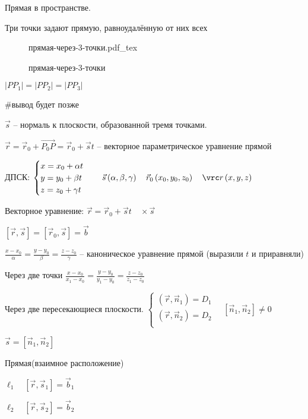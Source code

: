 \documentclass{book}
\theoremstyle{definition}
\newcommand\vect[1]{\overset{\longrightarrow}{#1}}
\newcommand{\incfig}[1]{%
    \def\svgwidth{\columnwidth}
    {#1.pdf_tex}
}
\begin{document}
Прямая в пространстве.

Три точки задают прямую, равноудалённую от них всех

\begin{figure}[ht]
    \centering
    \incfig{прямая-через-3-точки}
    \caption{прямая-через-3-точки}
    \label{fig:прямая через 3 точки}
\end{figure}

$\left| PP_1 \right| = \left| PP_2 \right|  = \left| PP_3 \right|  $

#вывод будет позже

$\vec s$ -- нормаль к плоскости, образованной тремя точками.

$\vec r = \vec r_0 + \vect{P_0P} = \vec r_0 + \vec st$ -- векторное параметрическое уравнение прямой

ДПСК:
$\begin{cases}
    x = x_0+\alpha t\\
    y = y_0+\beta t\\
    z = z_0+\gamma t\\
\end{cases}\quad \vec s\left( \alpha, \beta, \gamma \right) \quad \vec r_0\left( x_0, y_0, z_0 \right) \quad \vrc r\left( x, y, z \right) $ 

Векторное уравнение: $\vec r = \vec r_0 + \vec st\quad \times \vec s$

$\left[ \vec r, \vec s \right] = \left[ \vec r_0, \vec s \right]  = \vec b$

$\frac{x-x_0}{\alpha} = \frac{y-y_0}{\beta} = \frac{z-z_0}{\gamma}$ -- каноническое уравнение прямой (выразили $t$ и приравняли)

Через две точки $\frac{x-x_0}{x_1-x_0} = \frac{y-y_0}{y_1-y_0} = \frac{z-z_0}{z_1-z_0}$ 

Через две пересекающиеся плоскости. $\begin{cases}
    \left( \vec r, \vec n_1 \right) =D_1\\
    \left( \vec r, \vec n_2 \right) =D_2\\
\end{cases}\quad [\vec n_1, \vec n_2]\neq 0$

$\vec s = \left[ \vec n_1, \vec n_2 \right] $ 

Прямая(взаимное расположение)

$\ell_1\quad [\vec r, \vec s_1] = \vec b_1$

$\ell_2\quad [\vec r, \vec s_2] = \vec b_2$
\end{document}
